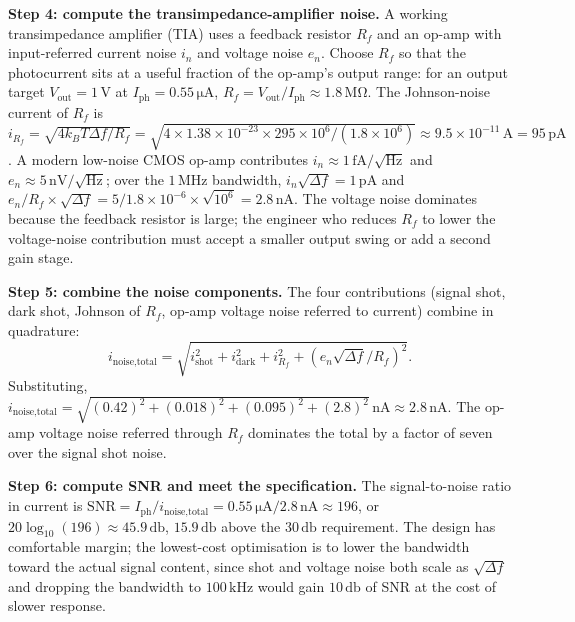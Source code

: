 \textbf{Step 4: compute the transimpedance-amplifier noise.} A
working transimpedance amplifier (TIA) uses a feedback resistor
$R_{f}$ and an op-amp with input-referred current noise $i_{n}$
and voltage noise $e_{n}$. Choose $R_{f}$ so that the photocurrent
sits at a useful fraction of the op-amp's output range: for an
output target $V_{\text{out}} = 1 \,\si{\volt}$ at $I_{\text{ph}}
= 0.55 \,\si{\micro\ampere}$, $R_{f} = V_{\text{out}}/I_{\text{ph}}
\approx 1.8 \,\si{\mega\ohm}$. The Johnson-noise current of
$R_{f}$ is $i_{R_{f}} = \sqrt{4 k_{B} T \Delta f / R_{f}} =
\sqrt{4 \times 1.38 \times 10^{-23} \times 295 \times 10^{6}/(1.8
\times 10^{6})} \approx 9.5 \times 10^{-11} \,\si{\ampere} = 95
\,\si{\pico\ampere}$. A modern low-noise CMOS op-amp contributes
$i_{n} \approx 1 \,\si{\femto\ampere}/\sqrt{\si{\hertz}}$ and
$e_{n} \approx 5 \,\si{\nano\volt}/\sqrt{\si{\hertz}}$; over the
$1 \,\si{\mega\hertz}$ bandwidth, $i_{n} \sqrt{\Delta f} = 1 \,\si
{\pico\ampere}$ and $e_{n}/R_{f} \times \sqrt{\Delta f} =
5/1.8 \times 10^{-6} \times \sqrt{10^{6}} = 2.8 \,\si{\nano\ampere}$.
The voltage noise dominates because the feedback resistor is
large; the engineer who reduces $R_{f}$ to lower the voltage-noise
contribution must accept a smaller output swing or add a second
gain stage.

\textbf{Step 5: combine the noise components.} The four
contributions (signal shot, dark shot, Johnson of $R_{f}$, op-amp
voltage noise referred to current) combine in quadrature:
\[
i_{\text{noise,total}} = \sqrt{i_{\text{shot}}^{2} +
i_{\text{dark}}^{2} + i_{R_{f}}^{2} + (e_{n} \sqrt{\Delta f}/R_{f})^{2}}.
\]
Substituting, $i_{\text{noise,total}} = \sqrt{(0.42)^{2} +
(0.018)^{2} + (0.095)^{2} + (2.8)^{2}} \,\si{\nano\ampere}
\approx 2.8 \,\si{\nano\ampere}$. The op-amp voltage noise
referred through $R_{f}$ dominates the total by a factor of
seven over the signal shot noise.

\textbf{Step 6: compute SNR and meet the specification.} The
signal-to-noise ratio in current is $\mathrm{SNR} =
I_{\text{ph}}/i_{\text{noise,total}} = 0.55 \,\si{\micro\ampere}/
2.8 \,\si{\nano\ampere} \approx 196$, or $20 \log_{10}(196)
\approx 45.9 \,\si{\decibel}$, $15.9 \,\si{\decibel}$ above the
$30 \,\si{\decibel}$ requirement. The design has comfortable
margin; the lowest-cost optimisation is to lower the bandwidth
toward the actual signal content, since shot and voltage noise
both scale as $\sqrt{\Delta f}$ and dropping the bandwidth to
$100 \,\si{\kilo\hertz}$ would gain $10 \,\si{\decibel}$ of SNR
at the cost of slower response.

